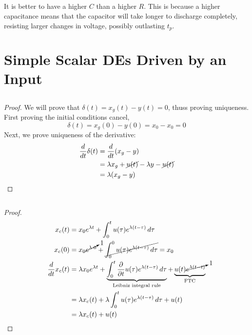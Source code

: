 \documentclass[]{article}
\newcommand{\diff}[1]{\frac{d}{d #1}}
\begin{document}
\subsection{}

It is better to have a higher \(C\) than a higher \(R\).
This is because a higher capacitance means that the capacitor will take longer to discharge completely, resisting larger changes in voltage, possibly outlasting \(t_p\).

\section{Simple Scalar DEs Driven by an Input}

\subsection{}

\begin{proof}
We will prove that \(\delta(t) = x_g(t) - y(t) = 0\), thuss proving uniqueness.
First proving the initial conditions cancel,
\begin{equation}
	\delta(t) = x_g(0) - y(0) = x_0 - x_0 = 0
\end{equation}
Next, we prove uniqueness of the derivative:
\begin{align}
	\diff{t} \delta(t) &= \diff{t} (x_g - y) \\
	&= \lambda x_g + \cancel{u(t)} - \lambda y - \cancel{u(t)} \\
	&= \lambda (x_g - y)
\end{align}
\end{proof}

\subsection{}

\begin{proof}
\begin{align}
	x_c(t) &= x_0 e^{\lambda t} + \int_0^t u(\tau) e^{\lambda (t - \tau)} \, d\tau \\
	x_c(0) &= x_0 \cancelto{1}{e^{\lambda \cdot 0}} + \cancel{\int_0^0 u(\tau) e^{\lambda (t - \tau)} \, d\tau} = x_0 \\
	\diff{t} x_c(t) &= \lambda x_0 e^{\lambda t} + \underbrace{\int_0^t \frac{\partial}{\partial t} u(\tau) e^{\lambda (t - \tau)} \, d\tau}_{\text{Leibniz integral rule}} + \underbrace{u(t) \cancelto{1}{e^{\lambda (t - t)}}}_{\text{FTC}} \\
	&= \lambda x_c(t) + \lambda \int_0^t u(\tau) e^{\lambda (t - \tau)} \, d\tau + u(t) \\
	&= \lambda x_c(t) + u(t)
\end{align}
\end{proof}
\end{document}
